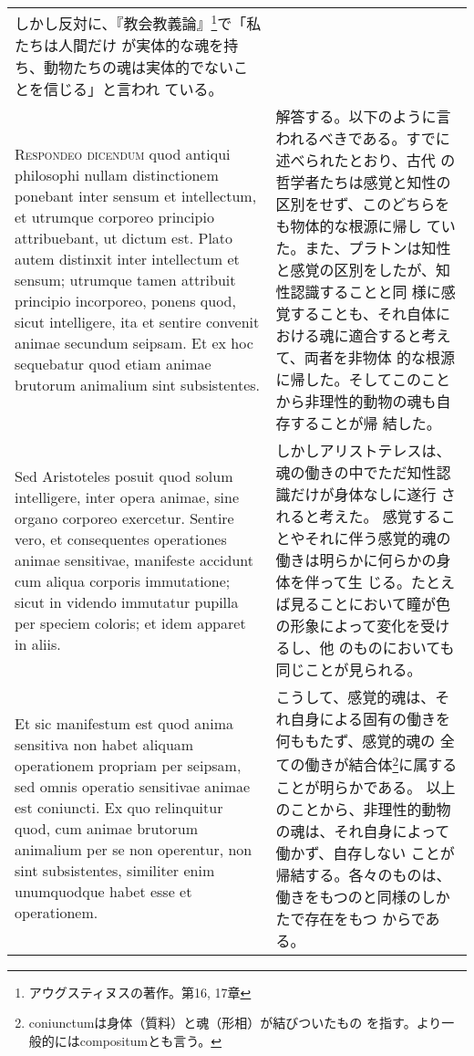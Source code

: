 \documentclass[paper=a4paper,fontsize=10pt,jafontsize=9pt,titlepage]{jlreq}
\begin{document}
\begin{longtable}{p{21em}p{21em}}
しかし反対に、『教会教義論』\footnote{アウグスティヌスの著作。第16, 17章}で「私たちは人間だけ
 が実体的な魂を持ち、動物たちの魂は実体的でないことを信じる」と言われ
 ている。


\\



{\scshape Respondeo dicendum} quod antiqui philosophi nullam distinctionem
ponebant inter sensum et intellectum, et utrumque corporeo principio
attribuebant, ut dictum est. Plato autem distinxit inter intellectum
et sensum; utrumque tamen attribuit principio incorporeo, ponens quod,
sicut intelligere, ita et sentire convenit animae secundum seipsam. Et
ex hoc sequebatur quod etiam animae brutorum animalium sint
subsistentes. 


&

解答する。以下のように言われるべきである。すでに述べられたとおり、古代
の哲学者たちは感覚と知性の区別をせず、このどちらをも物体的な根源に帰し
ていた。また、プラトンは知性と感覚の区別をしたが、知性認識することと同
様に感覚することも、それ自体における魂に適合すると考えて、両者を非物体
的な根源に帰した。そしてこのことから非理性的動物の魂も自存することが帰
結した。

\\



Sed Aristoteles posuit quod solum intelligere, inter
opera animae, sine organo corporeo exercetur. Sentire vero, et
consequentes operationes animae sensitivae, manifeste accidunt cum
aliqua corporis immutatione; sicut in videndo immutatur pupilla per
speciem coloris; et idem apparet in aliis. 


&

しかしアリストテレスは、魂の働きの中でただ知性認識だけが身体なしに遂行
 されると考えた。
感覚することやそれに伴う感覚的魂の働きは明らかに何らかの身体を伴って生
 じる。たとえば見ることにおいて瞳が色の形象によって変化を受けるし、他
 のものにおいても同じことが見られる。

\\


Et sic manifestum est quod
anima sensitiva non habet aliquam operationem propriam per seipsam,
sed omnis operatio sensitivae animae est coniuncti. Ex quo relinquitur
quod, cum animae brutorum animalium per se non operentur, non sint
subsistentes, similiter enim unumquodque habet esse et operationem.

&

こうして、感覚的魂は、それ自身による固有の働きを何ももたず、感覚的魂の
 全ての働きが結合体\footnote{coniunctumは身体（質料）と魂（形相）が結びついたもの
 を指す。より一般的にはcompositumとも言う。}に属することが明らかである。
以上のことから、非理性的動物の魂は、それ自身によって働かず、自存しない
 ことが帰結する。各々のものは、働きをもつのと同様のしかたで存在をもつ
 からである。


\end{longtable}
\end{document}
